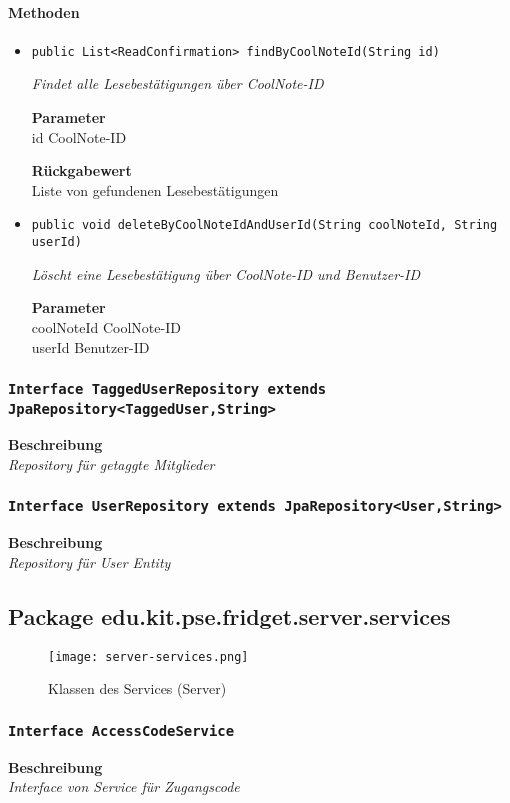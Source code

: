      \paragraph*{Methoden}
     \begin{itemize}
     	\item{\texttt{public List<ReadConfirmation> findByCoolNoteId(String id)}}
     	
     	\textit{Findet alle Lesebestätigungen über CoolNote-ID}
     	
     	\textbf{Parameter} \\
     	id CoolNote-ID
     	
     	\textbf{Rückgabewert} \\
     	Liste von gefundenen Lesebestätigungen        \item{\texttt{public void deleteByCoolNoteIdAndUserId(String coolNoteId, String userId)}}
     	
     	\textit{Löscht eine Lesebestätigung über CoolNote-ID und Benutzer-ID}
     	
     	\textbf{Parameter} \\
     	coolNoteId CoolNote-ID\\
     	userId Benutzer-ID
     	
     	
     \end{itemize}
     \subsubsection{\texttt{Interface TaggedUserRepository extends JpaRepository<TaggedUser,String>}}
     \textbf{Beschreibung} \\
     \textit{Repository für getaggte Mitglieder}
     \subsubsection{\texttt{Interface UserRepository extends JpaRepository<User,String>}}
     \textbf{Beschreibung} \\
     \textit{Repository für User Entity}
     \subsection{Package edu.kit.pse.fridget.server.services}
     \begin{figure}[H]
	       \centering
	       \texttt{[image: server-services.png]}
	       \caption{Klassen des Services (Server)}
	      \end{figure}
     \subsubsection{\texttt{Interface AccessCodeService}}
     \textbf{Beschreibung} \\
     \textit{Interface von Service für Zugangscode}
